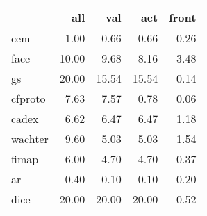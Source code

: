 \begin{tabular}{lrrrr}
\hline
{} &    all &    val &    act &  front \\ \hline
\hline
cem                 &   1.00 &   0.66 &   0.66 &   0.26 \\ \hline
face                &  10.00 &   9.68 &   8.16 &   3.48 \\ \hline
gs     &  20.00 &  15.54 &  15.54 &   0.14 \\ \hline
cfproto             &   7.63 &   7.57 &   0.78 &   0.06 \\ \hline
cadex               &   6.62 &   6.47 &   6.47 &   1.18 \\ \hline
wachter             &   9.60 &   5.03 &   5.03 &   1.54 \\ \hline
fimap               &   6.00 &   4.70 &   4.70 &   0.37 \\ \hline
ar &   0.40 &   0.10 &   0.10 &   0.20 \\ \hline
dice                &  20.00 &  20.00 &  20.00 &   0.52 \\ \hline
\hline
\end{tabular}
